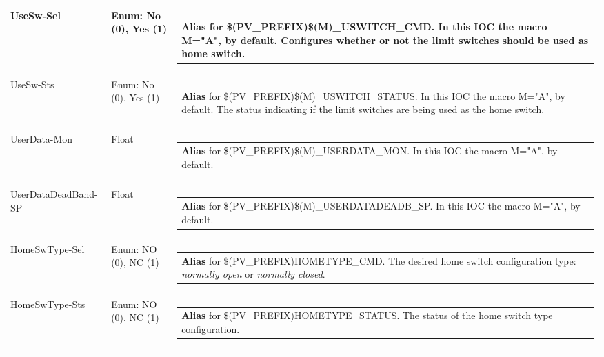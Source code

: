 \documentclass[openany]{article}
\begin{document}
\begin{longtable}{| m{4.5cm} m{2.5cm}  m{8.5cm} |}
        UseSw-Sel & Enum: No (0), Yes (1) & \begin{tabular}{@{}m{6cm}@{}}
                \textbf{\color{blue} Alias} for \$(PV\_PREFIX)\$(M)\_USWITCH\_CMD. In this IOC the macro M="A", by default. Configures whether or not the limit switches should be used as home switch.
            \end{tabular} \hypertarget{}{}\\ \hline
        UseSw-Sts & Enum: No (0), Yes (1) & \begin{tabular}{@{}m{6cm}@{}}
                \textbf{\color{blue} Alias} for \$(PV\_PREFIX)\$(M)\_USWITCH\_STATUS. In this IOC the macro M="A", by default. The status indicating if the limit switches are being used as the home switch.
            \end{tabular} \hypertarget{pv:user-data-mon}{}\\ \hline
        UserData-Mon & Float & \begin{tabular}{@{}m{6cm}@{}}
                \textbf{\color{blue} Alias} for \$(PV\_PREFIX)\$(M)\_USERDATA\_MON. In this IOC the macro M="A", by default.
            \end{tabular} \hypertarget{pv:user-data-deadband}{}\\ \hline
        UserDataDeadBand-SP & Float & \begin{tabular}{@{}m{6cm}@{}}
                \textbf{\color{blue} Alias} for \$(PV\_PREFIX)\$(M)\_USERDATADEADB\_SP. In this IOC the macro M="A", by default.
            \end{tabular} \hypertarget{pv:home-sw-type}{}\\ \hline
        HomeSwType-Sel & Enum: NO (0), NC (1) & \begin{tabular}{@{}m{6cm}@{}}
                \textbf{\color{blue} Alias} for \$(PV\_PREFIX)HOMETYPE\_CMD. The desired home switch configuration type: \emph{normally open} or \emph{normally closed}.
            \end{tabular} \hypertarget{}{}\\ \hline
        HomeSwType-Sts & Enum: NO (0), NC (1) & \begin{tabular}{@{}m{6cm}@{}}
                \textbf{\color{blue} Alias} for \$(PV\_PREFIX)HOMETYPE\_STATUS. The status of the home switch type configuration.
            \end{tabular} \hypertarget{pv:jog-after-home-sel}{}\\ \hline

\end{longtable}
\end{document}
